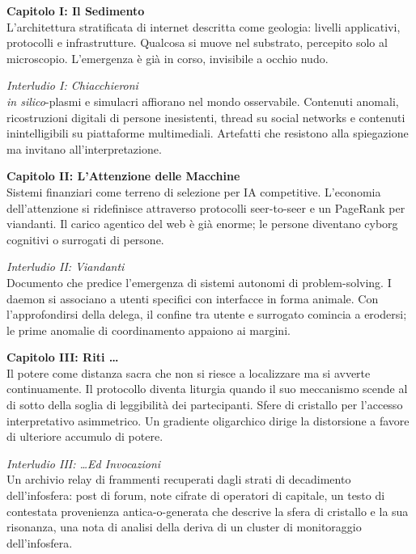 

{\small\sffamily

\noindent\textbf{Capitolo I: Il Sedimento}\\
L'architettura stratificata di internet descritta come geologia: livelli applicativi, protocolli e infrastrutture. Qualcosa si muove nel substrato, percepito solo al microscopio. L'emergenza è già in corso, invisibile a occhio nudo.

\medskip

\noindent\textit{Interludio I: Chiacchieroni}\\
\textit{in silico}-plasmi e simulacri affiorano nel mondo osservabile. Contenuti anomali, ricostruzioni digitali di persone inesistenti, thread su social networks e contenuti inintelligibili su piattaforme multimediali. Artefatti che resistono alla spiegazione ma invitano all'interpretazione.

\medskip

\noindent\textbf{Capitolo II: L'Attenzione delle Macchine}\\
Sistemi finanziari come terreno di selezione per IA competitive. L'economia dell'attenzione si ridefinisce attraverso protocolli seer-to-seer e un PageRank per viandanti. Il carico agentico del web è già enorme; le persone diventano cyborg cognitivi o surrogati di persone.

\medskip

\noindent\textit{Interludio II: Viandanti}\\
Documento che predice l'emergenza di sistemi autonomi di problem-solving. I daemon si associano a utenti specifici con interfacce in forma animale. Con l'approfondirsi della delega, il confine tra utente e surrogato comincia a erodersi; le prime anomalie di coordinamento appaiono ai margini.

\medskip

\noindent\textbf{Capitolo III: Riti \dots}\\
Il potere come distanza sacra che non si riesce a localizzare ma si avverte continuamente. Il protocollo diventa liturgia quando il suo meccanismo scende al di sotto della soglia di leggibilità dei partecipanti. Sfere di cristallo per l'accesso interpretativo asimmetrico. Un gradiente oligarchico dirige la distorsione a favore di ulteriore accumulo di potere.

\medskip

\noindent\textit{Interludio III: \dots Ed Invocazioni}\\
Un archivio relay di frammenti recuperati dagli strati di decadimento dell'infosfera: post di forum, note cifrate di operatori di capitale, un testo di contestata provenienza antica-o-generata che descrive la sfera di cristallo e la sua risonanza, una nota di analisi della deriva di un cluster di monitoraggio dell'infosfera.

}
